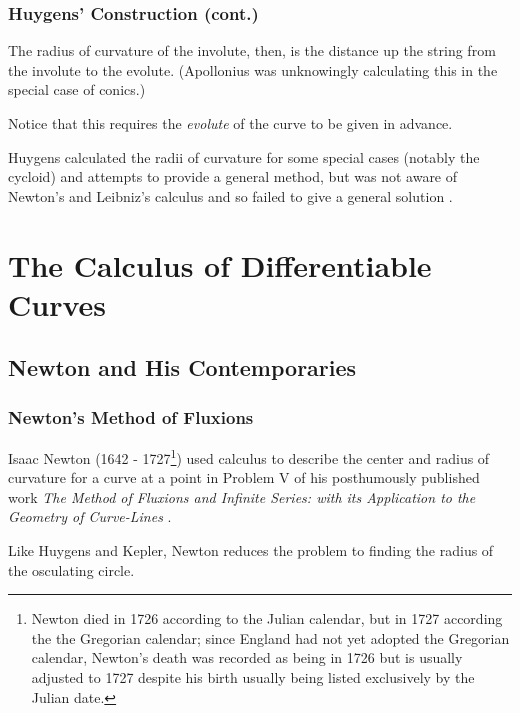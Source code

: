\documentclass[handout]{beamer}
\theoremstyle{definition}
\begin{document}
\begin{frame}
    \frametitle{Huygens' Construction (cont.)}

    \pause
    The radius of curvature of the involute, then, is the distance up the string from
    the involute to the evolute. (Apollonius was unknowingly calculating this in the
    special case of conics.)

    Notice that this requires the \emph{evolute} of the curve to be given in advance.

    \pause
    Huygens calculated the radii of curvature for some special cases (notably the cycloid)
    and attempts to provide a general method, but was not aware of Newton's and Leibniz's
    calculus and so failed to give a general solution \cite{unsat-hist}.
\end{frame}

\section{The Calculus of Differentiable Curves}

\subsection{Newton and His Contemporaries}

\begin{frame}
    \frametitle{Newton's Method of Fluxions}

    \pause
    Isaac Newton (1642 - 1727\footnote{Newton died in 1726 according to the Julian calendar,
    but in 1727 according the the Gregorian calendar; since England had not yet adopted the
    Gregorian calendar, Newton's death was recorded as being in 1726 but is usually adjusted
    to 1727 despite his birth usually being listed exclusively by the Julian date.})
    used calculus to describe the center and radius of curvature for a curve at a point
    in Problem V of his posthumously published work \textit{The Method of Fluxions and Infinite
    Series: with its Application to the Geometry of Curve-Lines} \cite{newton}.

    Like Huygens and Kepler, Newton reduces the problem to finding the radius of the osculating
    circle.

\end{frame}
\end{document}
